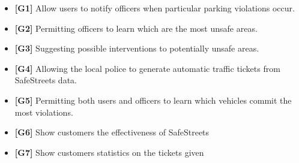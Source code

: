 \begin{itemize}

\item \textbf{[\hypertarget{G1}{G1}]} Allow users to notify officers when particular parking violations occur.

\item \textbf{[\hypertarget{G2}{G2}]} Permitting officers to learn which are the most unsafe areas.

\item \textbf{[\hypertarget{G3}{G3}]} Suggesting possible interventions to potentially unsafe areas.

\item \textbf{[\hypertarget{G4}{G4}]} Allowing the local police to generate automatic traffic tickets from SafeStreets data.

\item \textbf{[\hypertarget{G5}{G5}]} Permitting both users and officers to learn which vehicles commit the most violations.

\item \textbf{[\hypertarget{G6}{G6}]} Show customers the effectiveness of SafeStreets

\item \textbf{[\hypertarget{G7}{G7}]} Show customers statistics on the tickets given

\end{itemize}